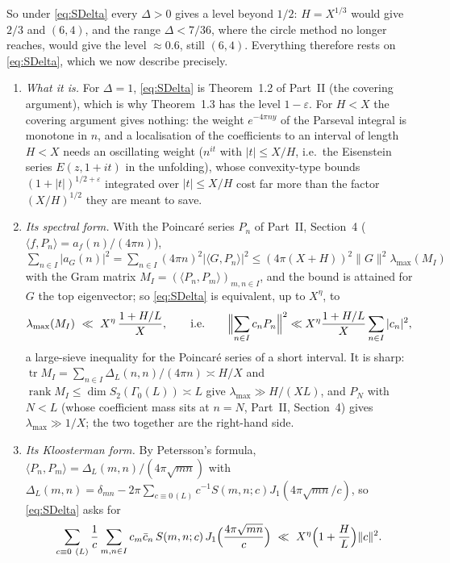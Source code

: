 \documentclass[11pt,a4paper]{article}
\theoremstyle{remark}
\theoremstyle{definition}
\newcommand{\e}{\varepsilon}
\begin{document}
So under \eqref{eq:SDelta} every $\Delta>0$ gives a level beyond $1/2$: $H=X^{1/3}$ would give $2/3$ and $(6,4)$, and the range $\Delta<7/36$, where the circle method no longer reaches, would give the level $\approx0.6$, still $(6,4)$. Everything therefore rests on \eqref{eq:SDelta}, which we now describe precisely.

\begin{enumerate}[label=\textup{(\alph*)},leftmargin=2.2em]
\item \emph{What it is.} For $\Delta=1$, \eqref{eq:SDelta} is Theorem~1.2 of Part~II (the covering argument), which is why Theorem~1.3 has the level $1-\e$. For $H<X$ the covering argument gives nothing: the weight $e^{-4\pi ny}$ of the Parseval integral is monotone in $n$, and a localisation of the coefficients to an interval of length $H<X$ needs an oscillating weight ($n^{it}$ with $|t|\le X/H$, i.e.\ the Eisenstein series $E(z,1+it)$ in the unfolding), whose convexity-type bounds $(1+|t|)^{1/2+\e}$ integrated over $|t|\le X/H$ cost far more than the factor $(X/H)^{1/2}$ they are meant to save.
\item \emph{Its spectral form.} With the Poincar\'e series $P_n$ of Part~II, Section~4 ($\langle f,P_n\rangle=a_f(n)/(4\pi n)$), $\sum_{n\in I}|a_G(n)|^2=\sum_{n\in I}(4\pi n)^2|\langle G,P_n\rangle|^2\le(4\pi(X+H))^2\|G\|^2\lambda_{\max}(M_I)$ with the Gram matrix $M_I=(\langle P_n,P_m\rangle)_{m,n\in I}$, and the bound is attained for $G$ the top eigenvector; so \eqref{eq:SDelta} is equivalent, up to $X^\eta$, to
\[
\lambda_{\max}(M_I)\ \ll\ X^{\eta}\,\frac{1+H/L}{X},\qquad\text{i.e.}\qquad\Bigl\|\sum_{n\in I}c_nP_n\Bigr\|^2\ll X^{\eta}\frac{1+H/L}{X}\sum_{n\in I}|c_n|^2 ,
\]
a large-sieve inequality for the Poincar\'e series of a short interval. It is sharp: $\operatorname{tr}M_I=\sum_{n\in I}\Delta_L(n,n)/(4\pi n)\asymp H/X$ and $\operatorname{rank}M_I\le\dim S_2(\Gamma_0(L))\asymp L$ give $\lambda_{\max}\gg H/(XL)$, and $P_N$ with $N<L$ (whose coefficient mass sits at $n=N$, Part~II, Section~4) gives $\lambda_{\max}\gg1/X$; the two together are the right-hand side.
\item \emph{Its Kloosterman form.} By Petersson's formula, $\langle P_n,P_m\rangle=\Delta_L(m,n)/(4\pi\sqrt{mn})$ with $\Delta_L(m,n)=\delta_{mn}-2\pi\sum_{c\equiv0\,(L)}c^{-1}S(m,n;c)J_1(4\pi\sqrt{mn}/c)$, so \eqref{eq:SDelta} asks for
\[
\sum_{c\equiv0\ (L)}\frac1c\sum_{m,n\in I}c_m\bar c_n\,S(m,n;c)\,J_1\Bigl(\frac{4\pi\sqrt{mn}}c\Bigr)\ \ll\ X^{\eta}\Bigl(1+\frac HL\Bigr)\|c\|^2 .
\]

\end{enumerate}
\end{document}
